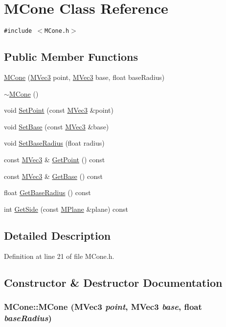 \hypertarget{class_m_cone}{
\section{MCone Class Reference}
\label{class_m_cone}
}
{\tt \#include $<$MCone.h$>$}

\subsection*{Public Member Functions}
\begin{CompactItemize}
\item 
\hyperlink{class_m_cone_ca2e4fc054a242b288f75952d1249e76}{MCone} (\hyperlink{class_m_vec3}{MVec3} point, \hyperlink{class_m_vec3}{MVec3} base, float baseRadius)
\item 
\hyperlink{class_m_cone_5e54b9069d7d019da93478b2598c4521}{$\sim$MCone} ()
\item 
void \hyperlink{class_m_cone_b042fd985ba8aae1dd3cf354e4422011}{SetPoint} (const \hyperlink{class_m_vec3}{MVec3} \&point)
\item 
void \hyperlink{class_m_cone_b9a58767cd584b549fbc3e36a5184078}{SetBase} (const \hyperlink{class_m_vec3}{MVec3} \&base)
\item 
void \hyperlink{class_m_cone_1873ff8a7234cf756b5a947a06fc4b30}{SetBaseRadius} (float radius)
\item 
const \hyperlink{class_m_vec3}{MVec3} \& \hyperlink{class_m_cone_e207ab247ef75f4e45cbe8bd703cb261}{GetPoint} () const 
\item 
const \hyperlink{class_m_vec3}{MVec3} \& \hyperlink{class_m_cone_26a50da3857abe745450c04db852f8ea}{GetBase} () const 
\item 
float \hyperlink{class_m_cone_45c5c6ee9070a98eebd31e2348c33df7}{GetBaseRadius} () const 
\item 
int \hyperlink{class_m_cone_815fe27bdd5c6065acb810e4f3924dbc}{GetSide} (const \hyperlink{class_m_plane}{MPlane} \&plane) const 
\end{CompactItemize}


\subsection{Detailed Description}


Definition at line 21 of file MCone.h.

\subsection{Constructor \& Destructor Documentation}
\hypertarget{class_m_cone_ca2e4fc054a242b288f75952d1249e76}{
\subsubsection[{MCone}]{\setlength{\rightskip}{0pt plus 5cm}MCone::MCone ({\bf MVec3} {\em point}, \/  {\bf MVec3} {\em base}, \/  float {\em baseRadius})}}
\label{class_m_cone_ca2e4fc054a242b288f75952d1249e76}




